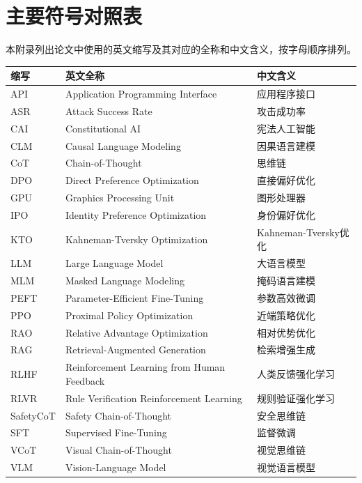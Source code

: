 
\chapter{主要符号对照表}

本附录列出论文中使用的英文缩写及其对应的全称和中文含义，按字母顺序排列。

\begin{longtable}{llp{6cm}}
\toprule
\textbf{缩写} & \textbf{英文全称} & \textbf{中文含义} \\
\midrule
\endhead
\bottomrule
\endfoot
API      & Application Programming Interface           & 应用程序接口 \\
ASR      & Attack Success Rate                         & 攻击成功率 \\
CAI      & Constitutional AI                           & 宪法人工智能 \\
CLM      & Causal Language Modeling                    & 因果语言建模 \\
CoT      & Chain-of-Thought                            & 思维链 \\
DPO      & Direct Preference Optimization              & 直接偏好优化 \\
GPU      & Graphics Processing Unit                    & 图形处理器 \\
IPO      & Identity Preference Optimization            & 身份偏好优化 \\
KTO      & Kahneman-Tversky Optimization               & Kahneman-Tversky优化 \\
LLM      & Large Language Model                        & 大语言模型 \\
MLM      & Masked Language Modeling                    & 掩码语言建模 \\
PEFT     & Parameter-Efficient Fine-Tuning             & 参数高效微调 \\
PPO      & Proximal Policy Optimization                & 近端策略优化 \\
RAO      & Relative Advantage Optimization             & 相对优势优化 \\
RAG      & Retrieval-Augmented Generation              & 检索增强生成 \\
RLHF     & Reinforcement Learning from Human Feedback  & 人类反馈强化学习 \\
RLVR     & Rule Verification Reinforcement Learning    & 规则验证强化学习 \\
SafetyCoT& Safety Chain-of-Thought                     & 安全思维链 \\
SFT      & Supervised Fine-Tuning                      & 监督微调 \\
VCoT     & Visual Chain-of-Thought                     & 视觉思维链 \\
VLM      & Vision-Language Model                       & 视觉语言模型 \\
\end{longtable}


